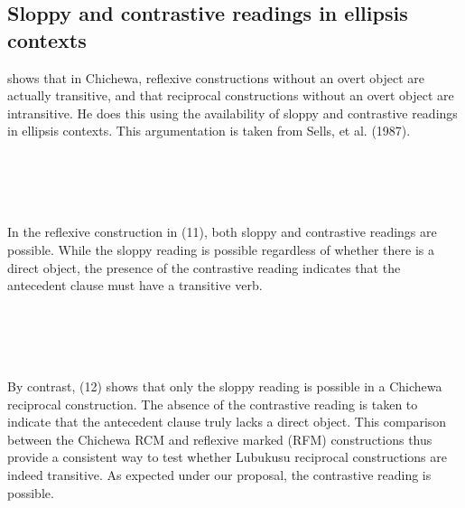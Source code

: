 \documentclass[output=paper]{langsci/langscibook}
\begin{document}
\subsection{Sloppy and contrastive readings in ellipsis contexts}

  \citet[106]{Mchombo2004} shows that in Chichewa, reflexive constructions without an overt object are actually transitive, and that reciprocal constructions without an overt object are intransitive. He does this using the availability of sloppy and contrastive readings in ellipsis contexts. This argumentation is taken from Sells, et al. (1987).



\ea\label{ex:}
\\
\ea\label{ex:}
\\
\ea\label{ex:}
\\
\ea\label{ex:}
\\


In the reflexive construction in (11), both sloppy and contrastive readings are possible. While the sloppy reading is possible regardless of whether there is a direct object, the presence of the contrastive reading indicates that the antecedent clause must have a transitive verb. 


\ea\label{ex:}
  \\
\ea\label{ex:}
\\
\ea\label{ex:}
\\
\ea\label{ex:}
  \\


By contrast, (12) shows that only the sloppy reading is possible in a Chichewa reciprocal construction. The absence of the contrastive reading is taken to indicate that the antecedent clause truly lacks a direct object. This comparison between the Chichewa RCM and reflexive marked (RFM) constructions thus provide a consistent way to test whether Lubukusu reciprocal constructions are indeed transitive. As expected under our proposal, the contrastive reading is possible.
\end{document}
